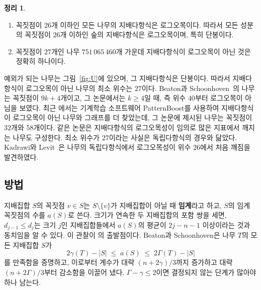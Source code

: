 \documentclass[11pt,a4paper]{article}
\theoremstyle{definition}
\newtheorem{theorem}{정리}[section]
\newcommand{\MaxLC}{26}
\newcommand{\MinNonLC}{27}
\begin{document}
\begin{theorem}\label{thm:smalltrees-intro}
\begin{enumerate}
\item[\textup{(i)}] 꼭짓점이 $\MaxLC$개 이하인 모든 나무의 지배다항식은 로그오목이다.
따라서 모든 성분의 꼭짓점이 $\MaxLC$개 이하인 숲의 지배다항식은 로그오목이며, 특히
단봉이다.
\item[\textup{(ii)}] 꼭짓점이 $\MinNonLC$개인 나무 $751\,065\,460$개 가운데 지배다항식이
로그오목이 아닌 것은 정확히 하나이다.
\end{enumerate}
\end{theorem}

예외가 되는 나무는 그림~\ref{fig:U}에 있으며, 그 지배다항식은 단봉이다. 따라서
지배다항식이 로그오목이 아닌 나무의 최소 위수는 $\MinNonLC$이다. Beaton과
Schoonhoven~\cite{BS}의 나무는 꼭짓점이 $9k+4$개이고, 그 논문에서는 $k\ge4$일 때, 즉
위수 $40$부터 로그오목이 아님을 보였다. 최근 \cite{DHP}에서는 기계학습 소프트웨어
PatternBoost를 사용하여 지배다항식이 로그오목이 아닌 나무와 그래프를 더 찾았는데,
그 논문에 제시된 나무는 꼭짓점이 $32$개와 $58$개이다. 같은 논문은 지배다항식의
로그오목성이 임의로 많은 지표에서 깨지는 나무도 구성한다. 최소 위수가
$\MinNonLC$이라는 사실은 독립다항식의 경우와 닮았다. Kadrawi와 Levit~\cite{KL}은
나무의 독립다항식에서 로그오목성이 위수 $26$에서 처음 깨짐을 발견하였다.

\subsection*{방법}
지배집합 $S$의 꼭짓점 $v\in S$는 $S\setminus\{v\}$가 지배집합이 아닐 때
\textbf{임계}라고 하고, $S$의 임계 꼭짓점의 수를 $a(S)$로 쓴다. 크기가 연속한 두
지배집합의 포함 쌍을 세면, $d_{j-1}\le d_j$는 크기 $j$인 지배집합들에서 $a(S)$의
평균이 $2j-n-1$ 이상이라는 것과 동치임을 알 수 있다. 이 관찰이 \cite{BS}의 출발점이다.
Beaton과 Schoonhoven은 나무 $T$의 모든 지배집합 $S$가
\begin{equation}\label{eq:BS-bounds}
  2\gamma(T)-|S|\;\le\; a(S)\;\le\; 2\Gamma(T)-|S|
\end{equation}
를 만족함을 증명하고, 이로부터 계수가 대략 $(n+2\gamma)/3$까지 증가하고 대략
$(n+2\Gamma)/3$부터 감소함을 이끌어 냈다. $\Gamma-\gamma\le2$이면 결정되지 않는
단계가 많아야 하나 남는다.
\end{document}
